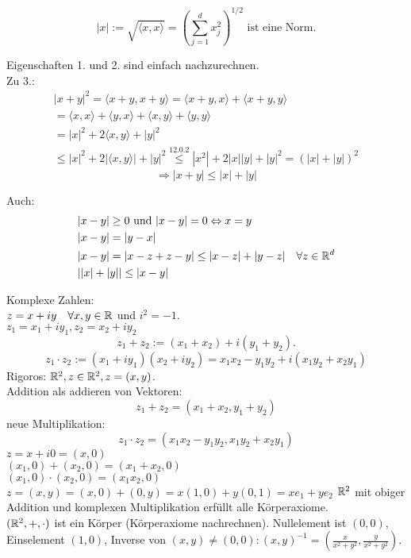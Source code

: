 \documentclass[../ana1.tex]{subfiles}
\begin{document}
\begin{satz}
	\[ |x| := \sqrt{\langle x,x\rangle} = \left(\sum_{j=1}^{d} x_j^2\right)^{1/2} \text{ ist eine Norm}. \]
\end{satz}
\begin{bew}
	Eigenschaften 1. und 2. sind einfach nachzurechnen.\\
	Zu 3.:
	\begin{align*}
		|x+y|^2 = \langle x+y,x+y\rangle=\langle x+y,x\rangle+\langle x+y,y\rangle\\
		= \langle x,x\rangle + \langle y,x\rangle + \langle x,y\rangle + \langle y,y\rangle\\
		=|x|^2 + 2\langle x,y\rangle + |y|^2\\
		\leq |x|^2 + 2|\langle x,y\rangle| + |y|^2 \overset{12.0.2}{\leq} |x^2| + 2|x||y| + |y|^2 = (|x|+|y|)^2
	\end{align*}
	\[ \Rightarrow |x+y| \leq |x| + |y| \]
\end{bew}
\begin{bem}
	Auch:
	\begin{align*}
		&|x - y| \geq 0 \text{ und } |x - y| = 0 \Leftrightarrow x = y\\
		&|x - y| = |y - x|\\
		&|x - y| = |x-z + z-y| \leq |x - z| + |y - z| \quad \forall z \in \mathbb{R}^d\\
		&||x| + |y|| \leq |x - y|
	\end{align*}
\end{bem}
Komplexe Zahlen:\\
\( z=x+iy \quad\forall x,y\in\mathbb{R} \) und \( i^2 = -1 \).\\
\( z_1 = x_1 + i y_1, z_2 = x_2 + i y_2 \)
\[ z_1 + z_2 := (x_1 + x_2) + i(y_1 + y_2). \]
\[ z_1 \cdot z_2 := (x_1 + i y_1)(x_2 + i y_2) = x_1x_2 - y_1y_2 + i(x_1y_2 + x_2y_1) \]
Rigoros: \( \mathbb{R}^2, z\in\mathbb{R}^2, z=(x,y) \).\\
Addition als addieren von Vektoren: \[ z_1 + z_2 = (x_1 + x_2, y_1 + y_2) \]
neue Multiplikation: \[ z_1 \cdot z_2 = (x_1 x_2 - y_1y_2, x_1y_2 + x_2y_1) \]
\( z = x+i 0 = (x,0) \)\\
\( (x_1,0) + (x_2,0) = (x_1+x_2,0) \)\\
\( (x_1,0)\cdot(x_2,0) = (x_1x_2,0) \)\\
\( z=(x,y) = (x,0) + (0,y) = x(1,0) + y(0,1) = x e_1 + y e_2 \)
\( \mathbb{R}^2 \) mit obiger Addition und \glqq komplexen\grqq{} Multiplikation erfüllt alle Körperaxiome.\\
\( (\mathbb{R}^2, +, \cdot) \) ist ein Körper (Körperaxiome nachrechnen). Nullelement ist \( (0,0) \), Einselement \((1,0)\), Inverse von \(  (x,y) \neq (0,0): (x,y)^{-1} = (\frac{x}{x^2+y^2}, \frac{y}{x^2+y^2}) \).
\end{document}

